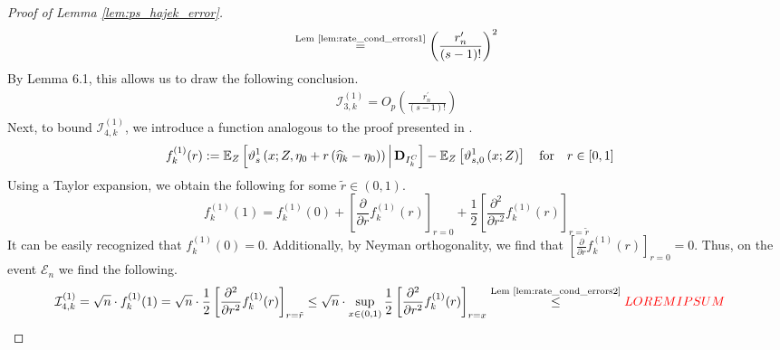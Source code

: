 \begin{proof}[Proof of Lemma \ref{lem:ps_hajek_error}]
\begin{equation}
\begin{aligned}
             \overset{\text{Lem \ref{lem:rate_cond_errors1}}}{=} \left(\frac{r_{n}^{\prime}}{(s-1)!}\right)^{2}
        \end{aligned}
    \end{equation}
    By \citet{chernozhukov_doubledebiased_2018} Lemma 6.1, this allows us to draw the following conclusion.
    \begin{equation}
        \begin{aligned}
            \mathcal{I}_{3,k}^{(1)} = O_{p}\left(\frac{r_{n}^{\prime}}{(s-1)!}\right)
        \end{aligned}
    \end{equation}  
    Next, to bound $\mathcal{I}_{4,k}^{(1)}$, we introduce a function analogous to the proof presented in \citet{chernozhukov_doubledebiased_2018}.
    \begin{equation}
        \begin{aligned}
            f_{k}^{(1)}(r) 
            & := \mathbb{E}_{Z}\left[\vartheta_{s}^{1}\left(x; Z, \eta_{0} + r \left(\widehat{\eta}_{k} - \eta_{0}\right)\right) \, \middle| \, \mathbf{D}_{I_{k}^{C}}\right] - \mathbb{E}_{Z}\left[\vartheta_{s,0}^{1}\left(x; Z\right) \right] 
            \quad \text{for} \quad r \in [0,1]
        \end{aligned}
    \end{equation}
    Using a Taylor expansion, we obtain the following for some $\tilde{r} \in (0,1)$.
    \begin{equation}
        f_{k}^{(1)}(1)
        = f_{k}^{(1)}(0) + \left[\frac{\partial}{\partial r}f_{k}^{(1)}(r)\right]_{r = 0} + \frac{1}{2}\left[\frac{\partial^{2}}{\partial r^{2}}f_{k}^{(1)}(r)\right]_{r = \tilde{r}}
    \end{equation}
    It can be easily recognized that $f_{k}^{(1)}(0) = 0$.
    Additionally, by Neyman orthogonality, we find that $\left[\frac{\partial}{\partial r}f_{k}^{(1)}(r)\right]_{r = 0} = 0$.
    Thus, on the event $\mathcal{E}_{n}$ we find the following.
    \begin{equation}
        \begin{aligned}
            \mathcal{I}_{4,k}^{(1)}
            & = \sqrt{n} \cdot f_{k}^{(1)}(1)
            = \sqrt{n} \cdot \frac{1}{2}\left[\frac{\partial^{2}}{\partial r^{2}}f_{k}^{(1)}(r)\right]_{r = \tilde{r}}
            \leq \sqrt{n} \cdot \sup_{x \in (0,1)} \frac{1}{2}\left[\frac{\partial^{2}}{\partial r^{2}}f_{k}^{(1)}(r)\right]_{r = x}
            \overset{\text{Lem \ref{lem:rate_cond_errors2}}}{\leq} {\color{red} LOREM IPSUM}
        \end{aligned}

\end{equation}
\end{proof}
